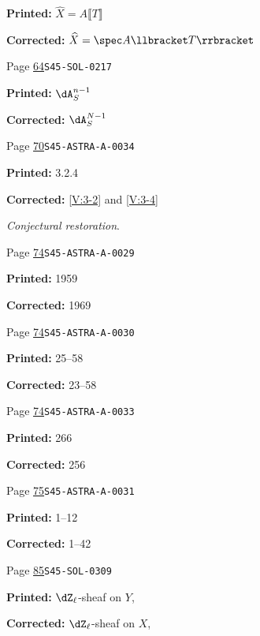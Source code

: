 \begin{description}
\par\noindent\textbf{Printed:} \(\widehat X=A\llbracket T\rrbracket\)
\par\noindent\textbf{Corrected:} \(\widehat X=\spec A\llbracket T\rrbracket\)
\smallskip
\item[\hypertarget{apparatus:EN-0022}{22}] Page \hyperlink{printpage:en:64}{64}\quad\texttt{S45-SOL-0217}
\par\noindent\textbf{Printed:} \(\dA_S^{n-1}\)
\par\noindent\textbf{Corrected:} \(\dA_S^{N-1}\)
\smallskip
\item[\hypertarget{apparatus:EN-0023}{23}] Page \hyperlink{printpage:en:70}{70}\quad\texttt{S45-ASTRA-A-0034}
\par\noindent\textbf{Printed:} 3.2.4
\par\noindent\textbf{Corrected:} \ref{V:3-2} and \ref{V:3-4}
\par\noindent\emph{Conjectural restoration}.
\smallskip
\item[\hypertarget{apparatus:EN-0024}{24}] Page \hyperlink{printpage:en:74}{74}\quad\texttt{S45-ASTRA-A-0029}
\par\noindent\textbf{Printed:} 1959
\par\noindent\textbf{Corrected:} 1969
\smallskip
\item[\hypertarget{apparatus:EN-0025}{25}] Page \hyperlink{printpage:en:74}{74}\quad\texttt{S45-ASTRA-A-0030}
\par\noindent\textbf{Printed:} 25--58
\par\noindent\textbf{Corrected:} 23--58
\smallskip
\item[\hypertarget{apparatus:EN-0026}{26}] Page \hyperlink{printpage:en:74}{74}\quad\texttt{S45-ASTRA-A-0033}
\par\noindent\textbf{Printed:} 266
\par\noindent\textbf{Corrected:} 256
\smallskip
\item[\hypertarget{apparatus:EN-0027}{27}] Page \hyperlink{printpage:en:75}{75}\quad\texttt{S45-ASTRA-A-0031}
\par\noindent\textbf{Printed:} 1--12
\par\noindent\textbf{Corrected:} 1--42
\smallskip
\item[\hypertarget{apparatus:EN-0028}{28}] Page \hyperlink{printpage:en:85}{85}\quad\texttt{S45-SOL-0309}
\par\noindent\textbf{Printed:} $\dZ_\ell$-sheaf on $Y$,
\par\noindent\textbf{Corrected:} $\dZ_\ell$-sheaf on $X$,

\end{description}
